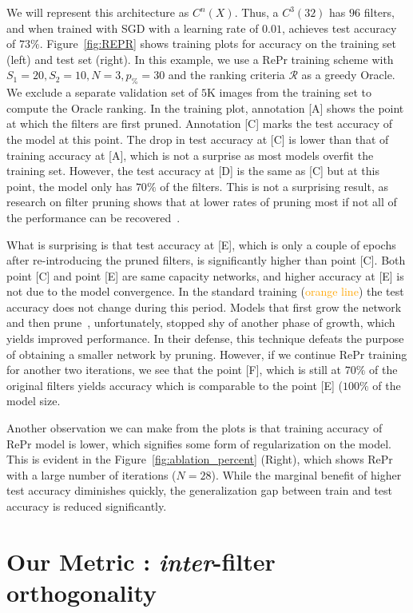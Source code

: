 We will represent this architecture as $C^n(X)$. Thus, a $C^3(32)$ has $96$ filters, and when trained with SGD with a learning rate of $0.01$, achieves test accuracy of $73\%$.
Figure~\ref{fig:REPR} shows training plots for accuracy on the training set (left) and test set (right). 
In this example, we use a RePr training scheme with $S_1=20, S_2=10, N=3, p_\%=30$ and the ranking criteria $\mathcal{R}$ as a greedy Oracle.
We exclude a separate validation set of $5$K images from the training set to compute the Oracle ranking.
In the training plot, annotation [A] shows the point at which the filters are first pruned.
Annotation [C] marks the test accuracy of the model at this point. 
The drop in test accuracy at [C] is lower than that of training accuracy at [A], which is not a surprise as most models overfit the training set.
However, the test accuracy at [D] is the same as [C] but at this point, the model only has $70\%$ of the filters. 
This is not a surprising result, as research on filter pruning shows that at lower rates of pruning most if not all of the performance can be recovered~\cite{Molchanov2016PruningCN}.

What is surprising is that test accuracy at [E], which is only a couple of epochs after re-introducing the pruned filters, is significantly higher than point [C].
Both point [C] and point [E] are same capacity networks, and higher accuracy at [E] is not due to the model convergence. 
In the standard training (\textcolor{orange}{orange line}) the test accuracy does not change during this period.
Models that first grow the network and then prune~\cite{Dai2017NeSTAN, Han2015LearningBW}, unfortunately, stopped shy of another phase of growth, which yields improved performance. 
In their defense, this technique defeats the purpose of obtaining a smaller network by pruning. 
However, if we continue RePr training for another two iterations, we see that the point [F], which is still at $70\%$ of the original filters yields accuracy which is comparable
to the point [E] ($100\%$ of the model size.

Another observation we can make from the plots is that training accuracy of RePr model is lower, which signifies some form of regularization on the model. 
This is evident in the Figure~\ref{fig:ablation_percent} (Right), which shows RePr with a large number of iterations ($N=28$). 
While the marginal benefit of higher test accuracy diminishes quickly, the generalization gap between train and test accuracy is reduced significantly.


\section{Our Metric : \textit{inter}-filter orthogonality} \label{sec:metric}

